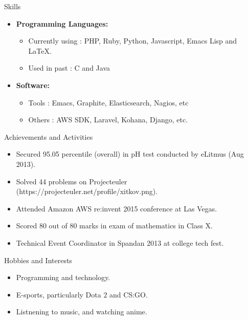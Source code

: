 \documentclass[11pt,oneside]{article}
\newenvironment{ressection}[1]{
  \vspace{4pt}
         {\fontfamily{phv}\selectfont\Large#1}
         \begin{itemize}
           \vspace{3pt}
}{
         \end{itemize}
}
\newcommand{\resitem}[1]{
  \vspace{-4pt}
\item \begin{flushleft} #1 \end{flushleft}
}
\newcommand{\ressubitem}[1]{
  \vspace{-1pt}
\item \begin{flushleft} #1 \end{flushleft}
}
\newenvironment{reslist}[1]{
  \resitem{\textbf{#1}}
  \vspace{-5pt}
  \begin{itemize}
}{
  \end{itemize}
}
\begin{document}

\begin{ressection}{Skills}
  \begin{reslist}{Programming Languages:}
    \ressubitem{Currently using : PHP, Ruby, Python, Javascript, Emacs Lisp and \LaTeX.}
    \ressubitem{Used in past : C and Java}
  \end{reslist}
  \begin{reslist}{Software:}
    \ressubitem{Tools : Emacs, Graphite, Elasticsearch, Nagios, etc}
    \ressubitem{Others : AWS SDK, Laravel, Kohana, Django, etc.}
  \end{reslist}
\end{ressection}


\begin{ressection}{Achievements and Activities}
  \resitem{Secured 95.05 percentile (overall) in pH test conducted by eLitmus (Aug 2013).}
  \resitem{Solved 44 problems on Projecteuler (https://projecteuler.net/profile/xitkov.png).}
  \resitem{Attended Amazon AWS re:invent 2015 conference at Las Vegas.}
  \resitem{Scored 80 out of 80 marks in exam of mathematics in Class X.}
  \resitem{Technical Event Coordinator in Spandan 2013 at college tech fest.}
\end{ressection}


\begin{ressection}{Hobbies and Interests}
  \resitem{Programming and technology.}
  \resitem{E-sports, particularly Dota 2 and CS:GO.}
  \resitem{Listnening to music, and watching anime.}
\end{ressection}
\end{document}
